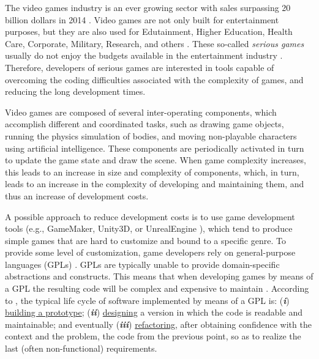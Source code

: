 The video games industry is an ever growing sector with sales surpassing 20 billion dollars in 2014 \cite{game_sales_esa}. Video games are not only built for entertainment purposes, but they are also used for Edutainment, Higher Education, Health Care, Corporate, Military, Research, and others \cite{CMP_Media_2004,serious_games}. These so-called \textit{serious games} usually do not enjoy the budgets available in the entertainment industry \cite{stapleton2004serious}. Therefore, developers of serious games are interested in tools capable of overcoming the coding difficulties associated with the complexity of games, and reducing the long development times.

Video games are composed of several inter-operating components, which accomplish different and coordinated tasks, such as drawing game objects, running the physics simulation of bodies, and moving non-playable characters using artificial intelligence. These components are periodically activated in turn to update the game state and draw the scene. When game complexity increases, this leads to an increase in size and complexity of components, which, in turn, leads to an increase in the complexity of developing and maintaining them, and thus an increase of development costs.


A possible approach to reduce development costs is to use game development tools (e.g., GameMaker, Unity3D, or UnrealEngine \cite{petridis2010engine}), which tend to produce simple games that are hard to customize and bound to a specific genre. To provide some level of customization, game developers rely on general-purpose languages (GPLs) \cite{lewis2002game}. GPLs are typically unable to provide domain-specific abstractions and constructs. This means that when developing games by means of a GPL the resulting code will be complex and expensive to maintain \cite{Rocki:2014:FAP:2554850.2555029,sujeeth2014delite}. According to \cite{beck2000extreme}, the typical life cycle of software implemented by means of a GPL is: (\textit{\textbf{i}}) \underline{building a prototype}; (\textit{\textbf{ii}}) \underline{designing} a version in which the code is readable and maintainable; and eventually (\textit{\textbf{iii}}) \underline{refactoring}, after obtaining confidence with the context and the problem, the code from the previous point, so as to realize the last (often non-functional) requirements. 

